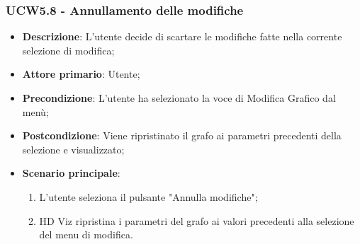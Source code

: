 \subsubsection{UCW5.8 - Annullamento delle modifiche}
\label{ssub:ucw5.8}
\begin{itemize}
    \item \textbf{Descrizione}: L'utente decide di scartare le modifiche fatte nella corrente selezione di modifica;

    \item \textbf{Attore primario}: Utente;

    \item \textbf{Precondizione}:   L'utente ha selezionato la voce di Modifica Grafico dal menù;
    \item \textbf{Postcondizione}:  Viene ripristinato il grafo ai parametri precedenti della selezione e visualizzato;

	\item \textbf{Scenario principale}:
        \begin{enumerate}
            \item L'utente seleziona il pulsante "Annulla modifiche";
            \item HD Viz ripristina i parametri del grafo ai valori precedenti alla selezione del menu di modifica.
        \end{enumerate}
\end{itemize}
